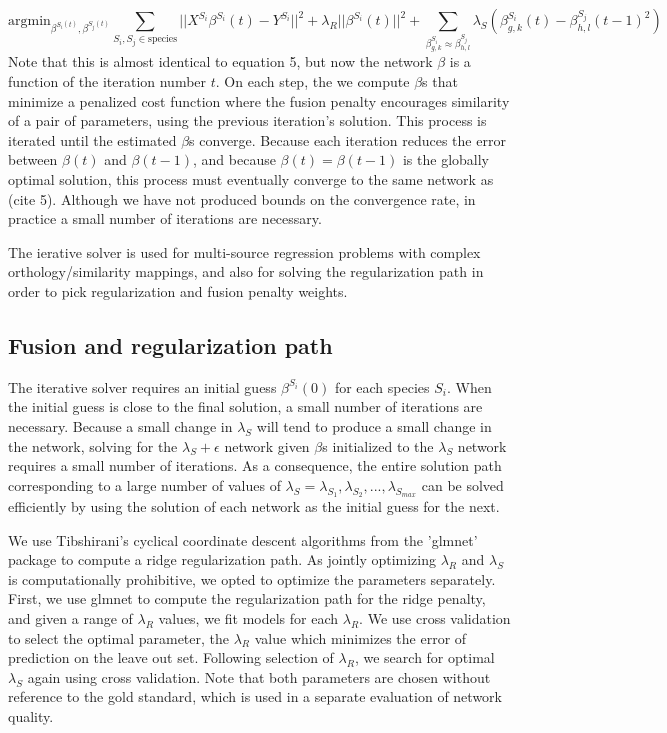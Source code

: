 \documentclass[11pt]{article}
\begin{document}
\begin{equation}
\text{argmin}_{\beta^{S_i(t)}, \beta^{S_j(t)}} \displaystyle\sum_{S_i, S_j \in \text{species}} ||X^{S_i}\beta^{S_i}(t) - Y^{S_i}||^2 + \lambda_R||\beta^{S_i}(t)||^2 + \displaystyle \sum_{\beta_{g,k}^{S_i} \approx \beta_{h,l}^{S_j}} \lambda_S(\beta^{S_i}_{g,k}(t) - \beta_{h,l}^{S_j}(t-1)^2)
\end{equation}
Note that this is almost identical to equation 5, but now the network $\beta$ is a function of the iteration number $t$. On each step, the we compute $\beta$s that minimize a penalized cost function where the fusion penalty encourages similarity of a pair of parameters, using the previous iteration's solution. This process is iterated until the estimated $\beta$s converge. Because each iteration reduces the error between $\beta(t)$ and $\beta(t-1)$, and because $\beta(t) = \beta(t-1)$ is the globally optimal solution, this process must eventually converge to the same network as (cite 5). Although we have not produced bounds on the convergence rate, in practice a small number of iterations are necessary.

The ierative solver is used for multi-source regression problems with complex orthology/similarity mappings, and also for solving the regularization path in order to pick regularization and fusion penalty weights. 

\subsection{Fusion and regularization path}
The iterative solver requires an initial guess $\beta^{S_i}(0)$ for each species $S_i$. When the initial guess is close to the final solution, a small number of iterations are necessary. Because a small change in $\lambda_S$ will tend to produce a small change in the network, solving for the $\lambda_S+\epsilon$ network given $\beta$s initialized to the $\lambda_S$ network requires a small number of iterations. As a consequence, the entire solution path corresponding to a large number of values of $\lambda_S= \lambda_S_1, \lambda_S_2, ..., \lambda_S_{max}$ can be solved efficiently by using the solution of each network as the initial guess for the next. 

We use Tibshirani's cyclical coordinate descent algorithms from the 'glmnet' package \cite{friedman_regularization_2010} to compute a ridge regularization path. As jointly optimizing $\lambda_R$ and $\lambda_S$ is computationally prohibitive, we opted to optimize the parameters separately. First, we use glmnet to compute the regularization path for the ridge penalty, and given a range of $\lambda_R$ values, we fit models for each $\lambda_R$. We use cross validation to select the optimal parameter, the $\lambda_R$ value which minimizes the error of prediction on the leave out set. Following selection of $\lambda_R$, we search for optimal $\lambda_S$ again using cross validation. Note that both parameters are chosen without reference to the gold standard, which is used in a separate evaluation of network quality. 
\end{document}
